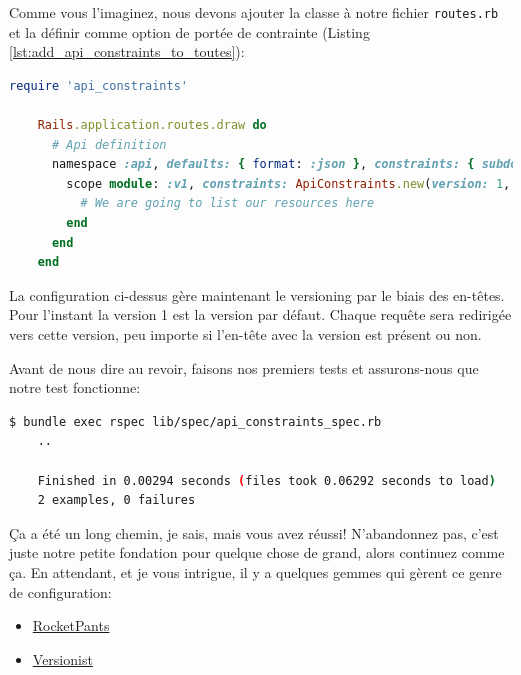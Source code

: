 \documentclass[]{report}
\begin{document}
    Comme vous l'imaginez, nous devons ajouter la classe à notre fichier \verb|routes.rb| et la définir comme option de portée de contrainte (Listing \ref{lst:add_api_constraints_to_toutes}):

    \begin{scriptsize}
    \begin{lstlisting}[language=ruby, caption={Ajout de la contrainte à la route (config/routes.rb)}, label={lst:add_api_constraints_to_toutes}]
    require 'api_constraints'

    Rails.application.routes.draw do
      # Api definition
      namespace :api, defaults: { format: :json }, constraints: { subdomain: 'api' }, path: '/' do
        scope module: :v1, constraints: ApiConstraints.new(version: 1, default: true) do
          # We are going to list our resources here
        end
      end
    end
    \end{lstlisting}
    \end{scriptsize}

    La configuration ci-dessus gère maintenant le versioning par le biais des en-têtes. Pour l'instant la version 1 est la version par défaut. Chaque requête sera redirigée vers cette version, peu importe si l'en-tête avec la version est présent ou non.

    Avant de nous dire au revoir, faisons nos premiers tests et assurons-nous que notre test fonctionne:

    \begin{scriptsize}
    \begin{lstlisting}[language=bash]
    $ bundle exec rspec lib/spec/api_constraints_spec.rb
    ..

    Finished in 0.00294 seconds (files took 0.06292 seconds to load)
    2 examples, 0 failures
    \end{lstlisting}
    \end{scriptsize}

    Ça a été un long chemin, je sais, mais vous avez réussi! N'abandonnez pas, c'est juste notre petite fondation pour quelque chose de grand, alors continuez comme ça. En attendant, et je vous intrigue, il y a quelques gemmes qui gèrent ce genre de configuration:

    \begin{itemize}
      \item \href{https://github.com/Sutto/rocket_pants}{RocketPants}
      \item \href{https://github.com/bploetz/versionist}{Versionist}
    \end{itemize}
\end{document}
